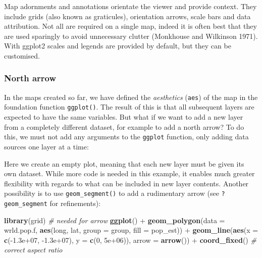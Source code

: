 \documentclass[]{article}
\newenvironment{Shaded}{}{}
\newcommand{\KeywordTok}[1]{\textcolor[rgb]{0.00,0.44,0.13}{\textbf{{#1}}}}
\newcommand{\DataTypeTok}[1]{\textcolor[rgb]{0.56,0.13,0.00}{{#1}}}
\newcommand{\DecValTok}[1]{\textcolor[rgb]{0.25,0.63,0.44}{{#1}}}
\newcommand{\FloatTok}[1]{\textcolor[rgb]{0.25,0.63,0.44}{{#1}}}
\newcommand{\StringTok}[1]{\textcolor[rgb]{0.25,0.44,0.63}{{#1}}}
\newcommand{\CommentTok}[1]{\textcolor[rgb]{0.38,0.63,0.69}{\textit{{#1}}}}
\newcommand{\NormalTok}[1]{{#1}}
\begin{document}
Map adornments and annotations orientate the viewer and provide context.
They include grids (also known as graticules), orientation arrows, scale
bars and data attribution. Not all are required on a single map, indeed
it is often best that they are used sparingly to avoid unnecessary
clutter (Monkhouse and Wilkinson 1971). With ggplot2 scales and legends
are provided by default, but they can be customised.

\subsubsection{North arrow}\label{north-arrow}

In the maps created so far, we have defined the \emph{aesthetics}
(\texttt{aes}) of the map in the foundation function \texttt{ggplot()}.
The result of this is that all subsequent layers are expected to have
the same variables. But what if we want to add a new layer from a
completely different dataset, for example to add a north arrow? To do
this, we must not add any arguments to the \texttt{ggplot} function,
only adding data sources one layer at a time:

Here we create an empty plot, meaning that each new layer must be given
its own dataset. While more code is needed in this example, it enables
much greater flexibility with regards to what can be included in new
layer contents. Another possibility is to use \texttt{geom\_segment()}
to add a rudimentary arrow (see \texttt{?geom\_segment} for
refinements):

\begin{Shaded}
\begin{Highlighting}[]
\KeywordTok{library}\NormalTok{(grid)  }\CommentTok{# needed for arrow}
\KeywordTok{ggplot}\NormalTok{() +}\StringTok{ }\KeywordTok{geom_polygon}\NormalTok{(}\DataTypeTok{data =} \NormalTok{wrld.pop.f, }\KeywordTok{aes}\NormalTok{(long, lat, }\DataTypeTok{group =} \NormalTok{group, }\DataTypeTok{fill =} \NormalTok{pop_est)) +}\StringTok{ }
\StringTok{    }\KeywordTok{geom_line}\NormalTok{(}\KeywordTok{aes}\NormalTok{(}\DataTypeTok{x =} \KeywordTok{c}\NormalTok{(-}\FloatTok{1.3e+07}\NormalTok{, -}\FloatTok{1.3e+07}\NormalTok{), }\DataTypeTok{y =} \KeywordTok{c}\NormalTok{(}\DecValTok{0}\NormalTok{, }\FloatTok{5e+06}\NormalTok{)), }\DataTypeTok{arrow =} \KeywordTok{arrow}\NormalTok{()) +}\StringTok{ }
\StringTok{    }\KeywordTok{coord_fixed}\NormalTok{()  }\CommentTok{# correct aspect ratio}
\end{Highlighting}
\end{Shaded}
\end{document}
